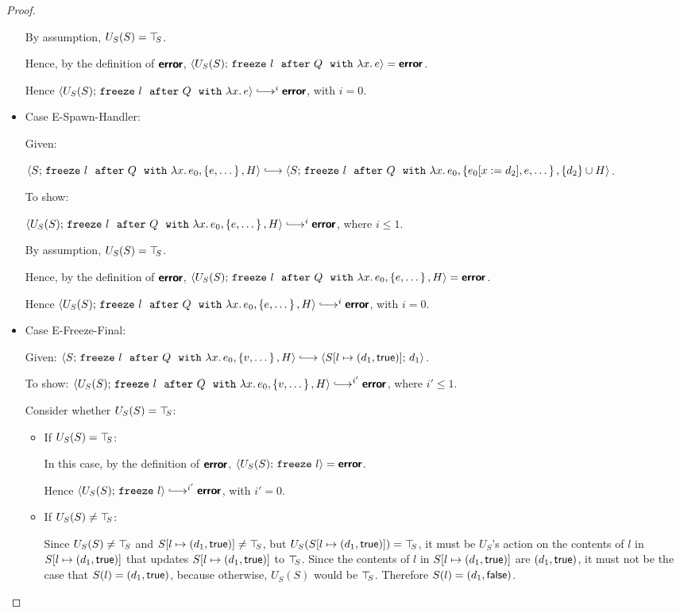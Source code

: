 \begin{proof}
\begin{itemize}
    By assumption, $U_S(S) = \top\hspace{-0.85mm}_{S}$.

    Hence, by the definition of $\textbf{\textsf{error}}$,
    $\langle U_S(S);\, \mbox{\texttt{freeze}}~l~~{\mbox{\texttt{after}}}~Q~~{\mbox{\texttt{with}}}~\lambda x.\,e \rangle = \textbf{\textsf{error}}$.

    Hence $\config{U_S(S)}{\freezeafter{l}{Q}{\lam{x}{e}}}
    \parstepsto^i \error$, with $i = 0$.

  \item Case {\sc E-Spawn-Handler}:

    Given:

    $\config{S}{\freezeafterfull{l}{Q}{\lam{x}{e_0}}{\setof{e,
          \dots}}{H}} \parstepsto
    \config{S}{\freezeafterfull{l}{Q}{\lam{x}{e_0}}{\setof{\subst{e_0}{x}{d_2},
          e, \dots}}{\{d_2\}\cup H}}$.

    To show:

    $\config{U_S(S)}{\freezeafterfull{l}{Q}{\lam{x}{e_0}}{\setof{e,
          \dots}}{H}} \parstepsto^i \error$, where $i \leq 1$.

    By assumption, $U_S(S) = \top\hspace{-0.85mm}_{S}$.

    Hence, by the definition of $\textbf{\textsf{error}}$,
    $\langle U_S(S);\, \mbox{\texttt{freeze}}~l~~{\mbox{\texttt{after}}}~Q~~{\mbox{\texttt{with}}}~\lambda x.\,e_0, \left\{e,
          \dots\right\}, H \rangle = \textbf{\textsf{error}}$.

    Hence
    $\config{U_S(S)}{\freezeafterfull{l}{Q}{\lam{x}{e_0}}{\setof{e,
          \dots}}{H}} \parstepsto^i \error$, with $i = 0$.

  \item Case {\sc E-Freeze-Final}:

    Given:
    $\config{S}{\freezeafterfull{l}{Q}{\lam{x}{e_0}}{\setof{v,
          \dots}}{H}} \parstepsto
    \config{\extS{S}{l}{d_1}{\frozentrue}}{d_1}$.

    To show:
    $\config{U_S(S)}{\freezeafterfull{l}{Q}{\lam{x}{e_0}}{\setof{v,
          \dots}}{H}} \parstepsto^{i'} \error$, where $i' \leq 1$.

    Consider whether $U_S(S) = \top\hspace{-0.85mm}_{S}$:
    \begin{itemize}

    \item If $U_S(S) = \top\hspace{-0.85mm}_{S}$:

      In this case, by the definition of $\textbf{\textsf{error}}$,
      $\langle U_S(S);\, \mbox{\texttt{freeze}}~l \rangle = \textbf{\textsf{error}}$.

      Hence $\config{U_S(S)}{\freeze{l}}
      \parstepsto^{i'} \error$, with $i' = 0$.

    \item If $U_S(S) \neq \top\hspace{-0.85mm}_{S}$:

      Since $U_S(S) \neq \top\hspace{-0.85mm}_{S}$ and $S[l \mapsto (d_1, \textsf{true})]
      \neq \top\hspace{-0.85mm}_{S}$, but $U_S(S[l \mapsto (d_1, \textsf{true})]) = \top\hspace{-0.85mm}_{S}$,
      it must be $U_S$'s action on the contents of $l$ in
      $S[l \mapsto (d_1, \textsf{true})]$ that updates
      $S[l \mapsto (d_1, \textsf{true})]$ to $\top\hspace{-0.85mm}_{S}$.  Since the contents
      of $l$ in $S[l \mapsto (d_1, \textsf{true})]$ are
      $(d_1, \textsf{true})$, it must not be the case that $S(l) =
      (d_1, \textsf{true})$, because otherwise, $U_S(S)$ would be
      $\top\hspace{-0.85mm}_{S}$.  Therefore $S(l) = (d_1, \textsf{false})$.


\end{itemize}
\end{itemize}
\end{proof}

